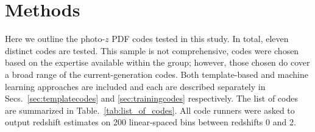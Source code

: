 \section{Methods}
\label{sec:pzcodes}


Here we outline the photo-$z$ PDF codes tested in this study. In total, eleven distinct codes are tested.  This sample is not comprehensive, codes were chosen based on the expertise available within the group; however, those chosen do cover a broad range of the current-generation codes.  Both template-based and machine learning approaches are included and each are described separately in Secs.~\ref{sec:templatecodes} and \ref{sec:trainingcodes} respectively. The list of codes are summarized in Table.~\ref{tab:list_of_codes}.  All code runners were asked to output redshift estimates on 200 linear-spaced bins between redshifts 0 and 2.

